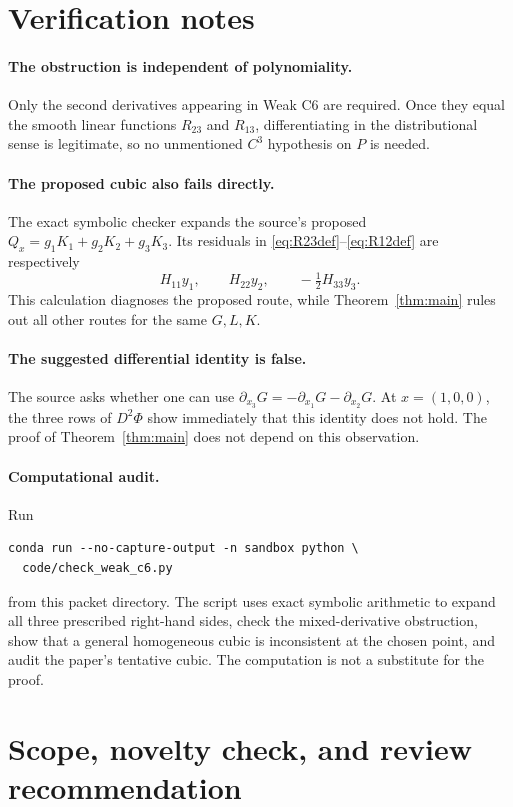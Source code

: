 \documentclass[11pt]{article}
\newcommand{\p}{\partial}
\begin{document}
\section{Verification notes}

\paragraph{The obstruction is independent of polynomiality.}
Only the second derivatives appearing in Weak C6 are required.  Once they
equal the smooth linear functions \(R_{23}\) and \(R_{13}\), differentiating
in the distributional sense is legitimate, so no unmentioned \(C^3\)
hypothesis on \(P\) is needed.

\paragraph{The proposed cubic also fails directly.}
The exact symbolic checker expands the source's proposed
\(Q_x=g_1K_1+g_2K_2+g_3K_3\).  Its residuals in
\eqref{eq:R23def}--\eqref{eq:R12def} are respectively
\[
H_{11}y_1,\qquad H_{22}y_2,\qquad -\tfrac12H_{33}y_3.
\]
This calculation diagnoses the proposed route, while Theorem~\ref{thm:main}
rules out all other routes for the same \(G,L,K\).

\paragraph{The suggested differential identity is false.}
The source asks whether one can use
\(\p_{x_3}G=-\p_{x_1}G-\p_{x_2}G\).  At \(x=(1,0,0)\), the three rows of
\(D^2\Phi\) show immediately that this identity does not hold.  The proof of
Theorem~\ref{thm:main} does not depend on this observation.

\paragraph{Computational audit.}
Run
\begin{verbatim}
conda run --no-capture-output -n sandbox python \
  code/check_weak_c6.py
\end{verbatim}
from this packet directory.  The script uses exact symbolic arithmetic to
expand all three prescribed right-hand sides, check the mixed-derivative
obstruction, show that a general homogeneous cubic is inconsistent at the
chosen point, and audit the paper's tentative cubic.  The computation is not
a substitute for the proof.

\section{Scope, novelty check, and review recommendation}
\end{document}

